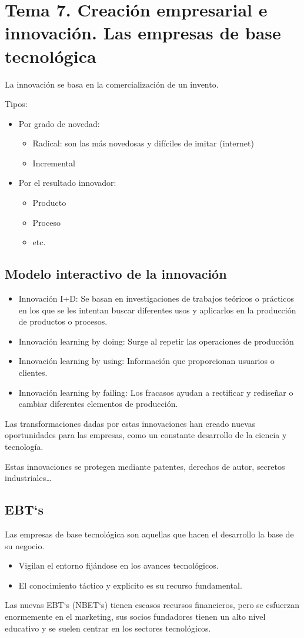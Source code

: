 \documentclass[12pt, twoside, openright]{report} %
\begin{document}
\chapter{Tema 7. Creación empresarial e innovación. Las empresas de base tecnológica}
La innovación se basa en la comercialización de un invento.

Tipos:
\begin{itemize}
	\item Por grado de novedad:
	      \begin{itemize}
		      \item Radical: son las más novedosas y difíciles de imitar (internet)
		      \item Incremental
	      \end{itemize}
	\item Por el resultado innovador:
	      \begin{itemize}
		      \item Producto
		      \item Proceso
		      \item etc.
	      \end{itemize}
\end{itemize}

\section{Modelo interactivo de la innovación}
\begin{itemize}
	\item Innovación I+D: Se basan en investigaciones de trabajos teóricos o prácticos en los que se les intentan buscar diferentes usos y aplicarlos en la producción de productos o procesos.
	\item Innovación learning by doing: Surge al repetir las operaciones de producción
	\item Innovación learning by using: Información que proporcionan usuarios o clientes.
	\item Innovación learning by failing: Los fracasos ayudan a rectificar y rediseñar o cambiar diferentes elementos de producción.
\end{itemize}


Las transformaciones dadas por estas innovaciones han creado nuevas oportunidades para las
empresas, como un constante desarrollo de la ciencia y tecnología.

Estas innovaciones se protegen mediante patentes, derechos de autor, secretos industriales…
\pagebreak
\section{EBT`s}
Las empresas de base tecnológica son aquellas que hacen el desarrollo la base de su negocio.
\begin{itemize}
	\item Vigilan el entorno fijándose en los avances tecnológicos.
	\item El conocimiento táctico y explicito es su recurso fundamental.
\end{itemize}

Las nuevas EBT`s (NBET`s) tienen escasos recursos financieros, pero se esfuerzan enormemente en el
marketing, sus socios fundadores tienen un alto nivel educativo y se suelen centrar en los sectores
tecnológicos.
\end{document}
